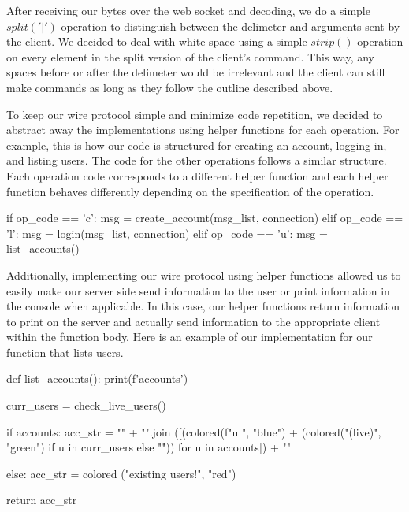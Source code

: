 \documentclass[
	a4paper, %
	10pt, %
	unnumberedsections, %
	twoside, %
]{LTJournalArticle}
\begin{document}
After receiving our bytes over the web socket and decoding, we do a simple 
$split('|')$ operation to distinguish between the delimeter and arguments sent by the client. We decided to deal with white space using a simple $strip()$ operation on every element in the split version of the client's command. This way, any spaces before or after the delimeter would be irrelevant and the client can still make commands as long as they follow the outline described above. 

To keep our wire protocol simple and minimize code repetition, we decided to abstract away the implementations using helper functions for each operation. For example, this is how our code is structured for creating an account, logging in, and listing users. The code for the other operations follows a similar structure. Each operation code corresponds to a different helper function and each helper function behaves differently depending on the specification of the operation.

\begin{python}
    if op_code == 'c': 
        msg = create_account(msg_list, 
        connection)
    elif op_code == 'l':
        msg = login(msg_list, connection)
    elif op_code == 'u':
        msg = list_accounts()
\end{python}

Additionally, implementing our wire protocol using helper functions allowed us to easily make our server side send information to the user or print information in the console when applicable. In this case, our helper functions return information to print on the server and actually send information to the appropriate client within the function body. Here is an example of our implementation for our function that lists users. 

\begin{python}
    def list_accounts(): 
        print(f'\nListing accounts\n')

        curr_users = check_live_users()

        if accounts: 
            acc_str = "\n" + "\n".join
            ([(colored(f"{u} ", "blue") + 
            (colored("(live)", "green") 
            if u in curr_users else ""))
            for u in accounts]) + "\n"
        
        else: 
            acc_str = colored
            ("\nNo existing users!\n", "red")

        return acc_str
\end{python}
\end{document}
